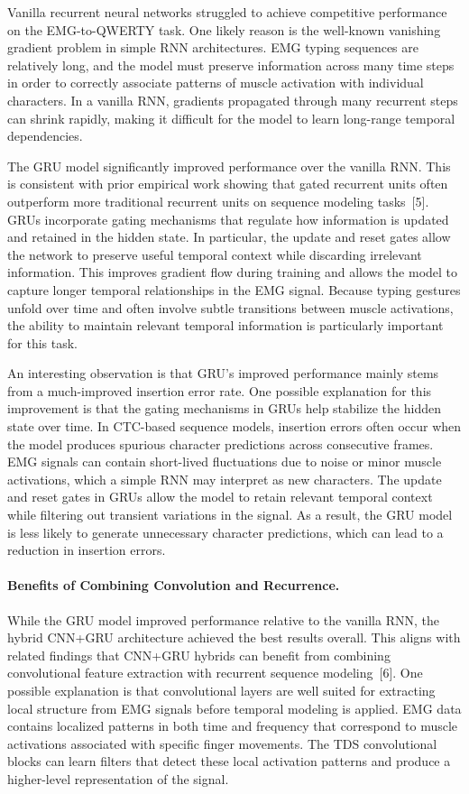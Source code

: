 \documentclass{article}
\begin{document}
Vanilla recurrent neural networks struggled to achieve competitive performance on the EMG-to-QWERTY task. One likely reason is the well-known vanishing gradient problem in simple RNN architectures. EMG typing sequences are relatively long, and the model must preserve information across many time steps in order to correctly associate patterns of muscle activation with individual characters. In a vanilla RNN, gradients propagated through many recurrent steps can shrink rapidly, making it difficult for the model to learn long-range temporal dependencies.

The GRU model significantly improved performance over the vanilla RNN\@. This is consistent with prior empirical work showing that gated recurrent units often outperform more traditional recurrent units on sequence modeling tasks~[5]. GRUs incorporate gating mechanisms that regulate how information is updated and retained in the hidden state. In particular, the update and reset gates allow the network to preserve useful temporal context while discarding irrelevant information. This improves gradient flow during training and allows the model to capture longer temporal relationships in the EMG signal. Because typing gestures unfold over time and often involve subtle transitions between muscle activations, the ability to maintain relevant temporal information is particularly important for this task.

An interesting observation is that GRU's improved performance mainly stems from a much-improved insertion error rate. One possible explanation for this improvement is that the gating mechanisms in GRUs help stabilize the hidden state over time. In CTC-based sequence models, insertion errors often occur when the model produces spurious character predictions across consecutive frames. EMG signals can contain short-lived fluctuations due to noise or minor muscle activations, which a simple RNN may interpret as new characters. The update and reset gates in GRUs allow the model to retain relevant temporal context while filtering out transient variations in the signal. As a result, the GRU model is less likely to generate unnecessary character predictions, which can lead to a reduction in insertion errors.

\paragraph{Benefits of Combining Convolution and Recurrence.}

While the GRU model improved performance relative to the vanilla RNN, the hybrid CNN+GRU architecture achieved the best results overall. This aligns with related findings that CNN+GRU hybrids can benefit from combining convolutional feature extraction with recurrent sequence modeling~[6]. One possible explanation is that convolutional layers are well suited for extracting local structure from EMG signals before temporal modeling is applied. EMG data contains localized patterns in both time and frequency that correspond to muscle activations associated with specific finger movements. The TDS convolutional blocks can learn filters that detect these local activation patterns and produce a higher-level representation of the signal.
\end{document}

